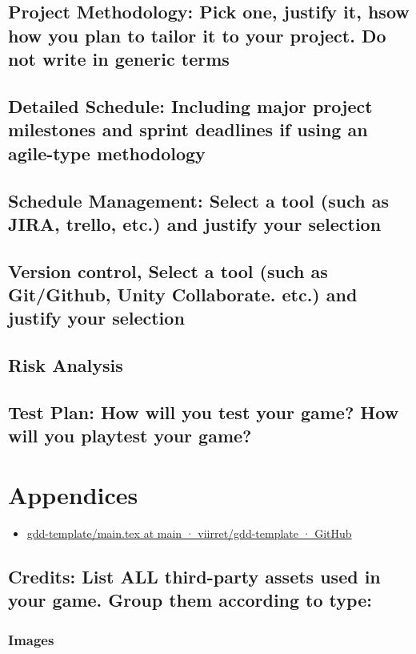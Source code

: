 \documentclass[article, 11pt]{article}
\begin{document}
\subsection{Project Methodology: Pick one, justify it, hsow how you plan to tailor it to your project. Do not write in generic terms}
\label{sec:org6902fc6}
\subsection{Detailed Schedule: Including major project milestones and sprint deadlines if using an agile-type methodology}
\label{sec:org0dfc38d}
\subsection{Schedule Management: Select a tool (such as JIRA, trello, etc.) and justify your selection}
\label{sec:orged29479}
\subsection{Version control, Select a tool (such as Git/Github, Unity Collaborate. etc.) and justify your selection}
\label{sec:org5d37b34}
\subsection{Risk Analysis}
\label{sec:org769fb0e}
\subsection{Test Plan: How will you test your game? How will you playtest your game?}
\label{sec:org07f38ee}

\section{Appendices}
\label{sec:org18fa6c6}
\begin{itemize}
\item \href{https://github.com/viirret/gdd-template/blob/main/main.tex}{gdd-template/main.tex at main · viirret/gdd-template · GitHub}
\end{itemize}
\subsection{Credits: List ALL third-party assets used in your game. Group them according to type:}
\label{sec:org928bbc0}
\subsubsection{Images}
\label{sec:orgad24e9c}
\end{document}
